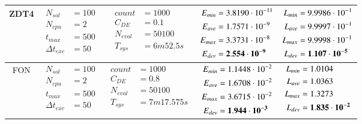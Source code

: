 \begin{table*} [!t]
\begin{tabular}[c]{ccccc}
\hline



ZDT4
&
{$\!\begin{aligned}
    N_{sol}        &= 100 \\
	N_{cpu}        &= 2 \\
	t_{max}        &= 500 \\
	\Delta t_{exc} &= 50
\end{aligned}$}
&
{$\!\begin{aligned}
	count    &= 1000 \\
	C_{DE}   &= 0.1 \\
	N_{eval} &= 50100 \\
	T_{sys}  &= 6m52.5s
\end{aligned}$}
&
{$\!\begin{aligned}
    E_{min} &= 3.8190\cdot 10^{-11} \\
    E_{ave} &= 1.7571\cdot 10^{-9} \\
    E_{max} &= 3.3731\cdot 10^{-8} \\
    E_{dev} &= {\bf 2.554\cdot 10^{-9}}
\end{aligned}$}
&
{$\!\begin{aligned}
    L_{min} &= 9.9986\cdot 10^{-1} \\
    L_{ave} &= 9.9997\cdot 10^{-1} \\
    L_{max} &= 9.9998\cdot 10^{-1} \\
    L_{dev} &= {\bf 1.107\cdot 10^{-5}}
\end{aligned}$} \\

\hline



FON
&
{$\!\begin{aligned}
    N_{sol}        &= 100 \\
	N_{cpu}        &= 2 \\
	t_{max}        &= 500 \\
	\Delta t_{exc} &= 50
\end{aligned}$}
&
{$\!\begin{aligned}
	count    &= 1000 \\
	C_{DE}   &= 0.8 \\
	N_{eval} &= 50100 \\
	T_{sys}  &= 7m17.575s
\end{aligned}$}
&
{$\!\begin{aligned}
    E_{min} &= 1.1448\cdot 10^{-2} \\
    E_{ave} &= 1.6708\cdot 10^{-2} \\
    E_{max} &= 3.6715\cdot 10^{-2} \\
    E_{dev} &= {\bf 1.944\cdot 10^{-3}}
\end{aligned}$}
&
{$\!\begin{aligned}
    L_{min} &= 1.0104 \\
    L_{ave} &= 1.0363 \\
    L_{max} &= 1.3273 \\
    L_{dev} &= {\bf 1.835\cdot 10^{-2}}
\end{aligned}$} \\


\end{tabular}
\end{table*}
